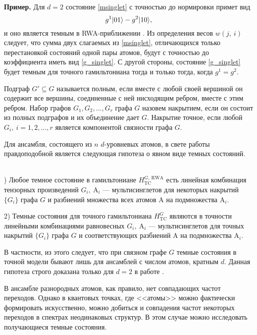 \textbf{Пример.} Для $d=2$ состояние \eqref{msinglet} с точностью до нормировки примет вид 
\begin{equation}
	\label{g_singlet}
	g^{1}|01\rangle-g^{2}|10\rangle,
\end{equation}
и оно является темным в RWA-приближении \cite{ozhigov_qq,rwa_rabi_1,rwa_rabi_2}. Из определения весов $w(j,~i)$ следует, что сумма двух слагаемых из \eqref{msinglet}, отличающихся только перестановкой состояний одной пары атомов, будут с точностью до коэффициента иметь вид \eqref{g_singlet}. С другой стороны, состояние \eqref{g_singlet} будет темным для точного гамильтониана тогда и только тогда, когда $g^{1}=g^{2}$. 

Подграф $G'\subseteq G$ называется полным, если вместе с любой своей вершиной он содержит все вершины, соединенные с ней нисходящим ребром, вместе с этим ребром. Набор графов $G_{1},G_{2},\dots,G_{r}$ графа $G$ назовем накрытием, если он состоит из полных подграфов и их объединение дает $G$. Накрытие точное, если любой $G_{i},~i=1,2,\dots,r$ является компонентой связности графа $G$. 

\noindent Для ансамбля, состоящего из $n$ $d$-уровневых атомов, в свете работы \cite{quantum_simulation_homogeneous} правдоподобной является следующая гипотеза о явном виде темных состояний.

\begin{hyp}
	\
	\\
	) Любое темное состояние в гамильтониане $H^{G,~\text{RWA}}_{\text{TC}}$ есть линейная комбинация тензорных произведений $G_{i},~\text{A}_{i}$ --- мультисинглетов для некоторых накрытий $\{ G_{i}\}$ графа $G$ и разбиений множества всех атомов $\text{A}$ на подмножества $\text{A}_{i}$. 
	
	2) Темные состояния для точного гамильтониана $H^G_{\text{TC}}$ являются в точности линейными комбинациями равновесных $G_{i},~\text{A}_{i}$ --- мультисинглетов для точных накрытий $\{ G_{i}\}$ графа $G$ и соответствующих разбиений $\text{A}$ на подмножества $\text{A}_{i}$. 
\end{hyp}

В частности, из этого следует, что при связном графе $G$ темные состояния в точной модели бывают лишь для ансамблей с числом атомов, кратным $d$. Данная гипотеза строго доказана только для $d=2$ в работе \cite{dark_states_dimension}.

В ансамбле разнородных атомов, как правило, нет совпадающих частот переходов. Однако в квантовых точках, где <<атомы>> можно фактически формировать искусственно, можно добиться и совпадения частот некоторых переходов в спектрах неодинаковых структур. В этом случае можно исследовать получающиеся темные состояния.

